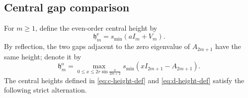 \documentclass[10pt,twoside]{siamart1116}
\numberwithin{equation}{section}
\begin{document}
\subsection{Central gap comparison}
\label{subsec:central-comparison}

For \(m\geq1\), define the even-order central height by
\begin{equation}\label{eq:c-height-def}
 \mathfrak h_m^{\mathrm e}=s_{\min}(aI_m+V_m).
\end{equation}
By reflection, the two gaps adjacent to the zero eigenvalue of
\(A_{2m+1}\) have the same height; denote it by
\begin{equation}\label{eq:d-height-def}
 \mathfrak h_m^{\mathrm o}=\max_{0\leq x\leq2r\sin\frac{\pi}{2m+2}}
 s_{\min}(xI_{2m+1}-A_{2m+1}).
\end{equation}
The central heights defined in \eqref{eq:c-height-def} and
\eqref{eq:d-height-def} satisfy the following strict alternation.

\end{document}
